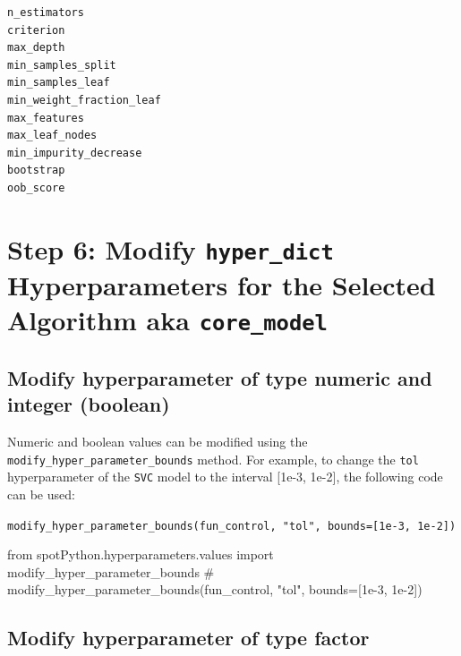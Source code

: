 \documentclass[
  letterpaper,
  DIV=11,
  numbers=noendperiod]{scrreprt}
\newenvironment{Shaded}{\begin{snugshade}}{\end{snugshade}}
\newcommand{\CommentTok}[1]{\textcolor[rgb]{0.37,0.37,0.37}{#1}}
\newcommand{\ImportTok}[1]{\textcolor[rgb]{0.00,0.46,0.62}{#1}}
\newcommand{\NormalTok}[1]{\textcolor[rgb]{0.00,0.23,0.31}{#1}}
\begin{document}
\begin{verbatim}
n_estimators
criterion
max_depth
min_samples_split
min_samples_leaf
min_weight_fraction_leaf
max_features
max_leaf_nodes
min_impurity_decrease
bootstrap
oob_score
\end{verbatim}

\hypertarget{step-6-modify-hyper_dict-hyperparameters-for-the-selected-algorithm-aka-core_model-1}{%
\section{\texorpdfstring{Step 6: Modify \texttt{hyper\_dict}
Hyperparameters for the Selected Algorithm aka
\texttt{core\_model}}{Step 6: Modify hyper\_dict Hyperparameters for the Selected Algorithm aka core\_model}}\label{step-6-modify-hyper_dict-hyperparameters-for-the-selected-algorithm-aka-core_model-1}}

\hypertarget{modify-hyperparameter-of-type-numeric-and-integer-boolean-1}{%
\subsection{Modify hyperparameter of type numeric and integer
(boolean)}\label{modify-hyperparameter-of-type-numeric-and-integer-boolean-1}}

Numeric and boolean values can be modified using the
\texttt{modify\_hyper\_parameter\_bounds} method. For example, to change
the \texttt{tol} hyperparameter of the \texttt{SVC} model to the
interval {[}1e-3, 1e-2{]}, the following code can be used:

\texttt{modify\_hyper\_parameter\_bounds(fun\_control,\ "tol",\ bounds={[}1e-3,\ 1e-2{]})}

\begin{Shaded}
\begin{Highlighting}[]
\ImportTok{from}\NormalTok{ spotPython.hyperparameters.values }\ImportTok{import}\NormalTok{ modify\_hyper\_parameter\_bounds}
\CommentTok{\# modify\_hyper\_parameter\_bounds(fun\_control, "tol", bounds=[1e{-}3, 1e{-}2])}
\end{Highlighting}
\end{Shaded}

\hypertarget{modify-hyperparameter-of-type-factor-1}{%
\subsection{Modify hyperparameter of type
factor}\label{modify-hyperparameter-of-type-factor-1}}
\end{document}
